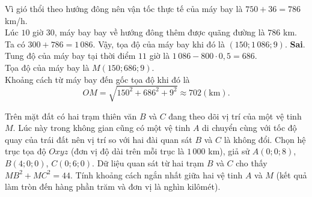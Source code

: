 \begin{ex}
{\begin{itemchoice}
			Vì gió thổi theo hướng đông nên vận tốc thực tế của máy bay là $750+36=786$ km/h.\\
			Lúc $10$ giờ $30$, máy bay bay về hướng đông thêm được quãng đường là $786$ km.\\
			Ta có $300+786=1\,086$. Vậy, tọa độ của máy bay khi đó là $(150; 1\,086;9)$.
			\itemch \textbf{Sai}.\\
			Tung độ của máy bay tại thời điểm $11$ giờ là
			$1\,086-800\cdot 0{,}5=686$.\\
			Tọa độ của máy bay là $M(150;686;9)$.\\
			Khoảng cách từ máy bay đến gốc tọa độ khi đó là
			$$OM=\sqrt{150^2+686^2+9^2}\approx 702(\mathrm{km}).$$
		\end{itemchoice}
	}
\end{ex}

\begin{bt}%

	Trên mặt đất có hai trạm thiên văn $B$ và $C$ đang theo dõi vị trí của một vệ tinh $M$. Lúc này trong không gian cũng có một vệ tinh $A$ di chuyển cùng với tốc độ quay của trái đất nên vị trí so với hai đài quan sát $B$ và $C$ là không đổi. Chọn hệ trục tọa độ $Oxyz$ (đơn vị độ dài trên mỗi trục là $1\,000$ km), giả sử $A(0; 0; 8)$, $B(4; 0; 0)$, $C(0; 6; 0)$. Dữ liệu quan sát từ hai trạm $B$ và $C$ cho thấy $MB^2+MC^2=44$. Tính khoảng cách ngắn nhất giữa hai vệ tinh $A$ và $M$ (kết quả làm tròn đến hàng phần trăm và đơn vị là nghìn kilômét).
\end{bt}

